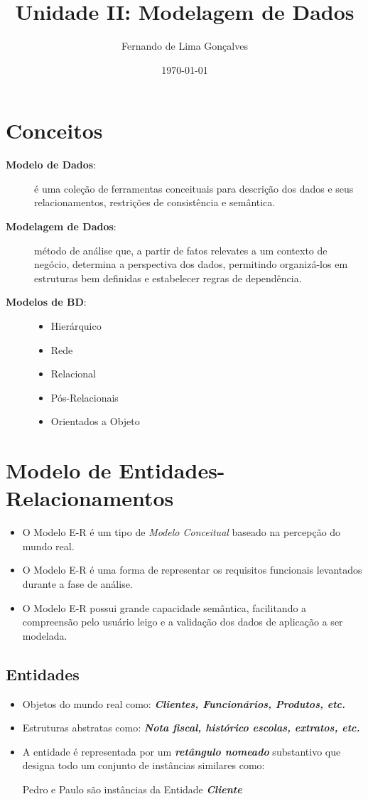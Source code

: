\documentclass[12pt,a4paper]{article}
\title{Unidade II: Modelagem de Dados}
\author{Fernando de Lima Gonçalves}
\date{\today}
\begin{document}
\maketitle

\section{Conceitos}
\begin{description}
    \item[\textbf{Modelo de Dados}:] 
        \sloppy é uma coleção de ferramentas conceituais para descrição dos dados e  
        seus relacionamentos, restrições de consistência e semântica.
    \item[\textbf{Modelagem de Dados}:] método de análise que, a partir de fatos relevates a um contexto de negócio, 
        determina a perspectiva dos dados, permitindo organizá-los em estruturas bem definidas e estabelecer regras de dependência.
    \item[\textbf{Modelos de BD}:]\hfill
        \begin{itemize}
            \item Hierárquico
            \item Rede
            \item Relacional
            \item Pós-Relacionais
            \item Orientados a Objeto
        \end{itemize}
\end{description}

\section{Modelo de Entidades-Relacionamentos}
\begin{itemize}
    \item O Modelo E-R é um tipo de \textit{Modelo Conceitual} baseado na percepção do mundo real.
    \item O Modelo E-R é uma forma de representar os requisitos funcionais levantados durante a fase de análise.
    \item O Modelo E-R possui grande capacidade semântica, facilitando a compreensão pelo usuário leigo e a validação dos dados de aplicação a ser modelada.
\end{itemize}

\subsection{Entidades}
\begin{itemize}
    \item Objetos do mundo real como: \textit{\textbf{Clientes, Funcionários, Produtos, etc.}}
    \item Estruturas abstratas como: \textit{\textbf{Nota fiscal, histórico escolas, extratos, etc.}}
    \item A entidade é representada por um \textbf{\textit{retângulo nomeado}} substantivo que designa todo um conjunto de instâncias similares como:\par Pedro e Paulo são instâncias da Entidade \textit{\textbf{Cliente}}
\end{itemize}
\end{document}
